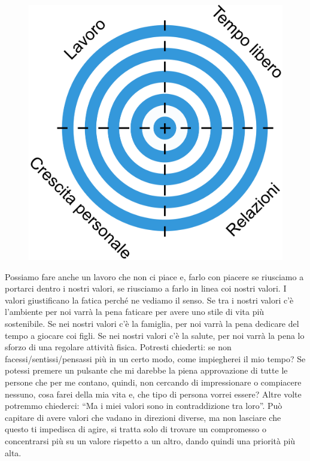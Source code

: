 \documentclass[12pt]{book} %
\begin{document}
\needspace{4cm}
\begin{figure}
  \centering
  \includegraphics[width=0.95\linewidth]{images/Libro-img014.png}
\end{figure}

Possiamo fare anche un lavoro che non ci piace e, farlo con piacere se riusciamo a portarci dentro i nostri valori, se
riusciamo a farlo in linea coi nostri valori. I valori giustificano la fatica perché ne vediamo il senso. Se tra i
nostri valori c'è l'ambiente per noi varrà la pena faticare per avere uno
stile di vita più sostenibile. Se nei nostri valori c'è la famiglia, per noi varrà la pena
dedicare del tempo a giocare coi figli. Se nei nostri valori c'è la salute, per noi varrà la pena
lo sforzo di una regolare attività fisica. Potresti chiederti: se non facessi/sentissi/pensassi più in un certo modo, come impiegherei il mio tempo? Se potessi premere un pulsante che mi darebbe la piena approvazione di
tutte le persone che per me contano, quindi, non cercando di impressionare o compiacere nessuno, cosa farei della
mia vita e, che tipo di persona vorrei essere? Altre volte potremmo chiederci: “Ma i miei valori sono in
contraddizione tra loro”. Può capitare di avere valori che vadano in direzioni diverse, ma non lasciare che questo ti
impedisca di agire, si tratta solo di trovare un compromesso o concentrarsi più su un valore rispetto a un altro, dando
quindi una priorità più alta.
\end{document}
